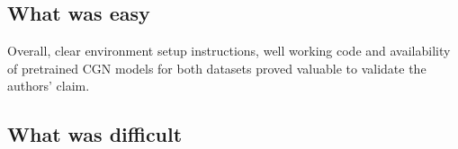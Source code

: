 \subsection*{What was easy}
Overall, clear environment setup instructions, well working code and availability of pretrained CGN models for both datasets proved valuable to validate the authors' claim. 


\subsection*{What was difficult}


